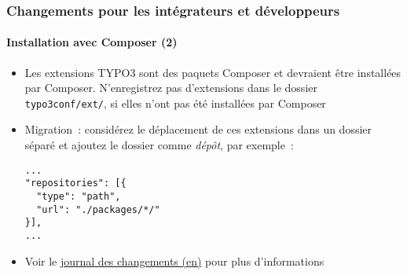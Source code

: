 %

\begin{frame}[fragile]
	\frametitle{Changements pour les intégrateurs et développeurs}
	\framesubtitle{Installation avec Composer (2)}


	\begin{itemize}
		\item Les extensions TYPO3 sont des paquets Composer et devraient être installées par Composer.
			N'enregistrez pas d'extensions dans le dossier \texttt{typo3conf/ext/},
			si elles n'ont pas été installées par Composer
		\item Migration~: considérez le déplacement de ces extensions dans un dossier séparé et ajoutez
			le dossier comme \textit{dépôt}, par exemple~:

\begin{lstlisting}
...
"repositories": [{
  "type": "path",
  "url": "./packages/*/"
}],
...
\end{lstlisting}

		\item Voir le
			\href{https://docs.typo3.org/c/typo3/cms-core/master/en-us/Changelog/master/Deprecation-94996-InComposerModeAllExtensionsShouldBeInstalledWithComposer.html}{journal des changements (en)}
			pour plus d'informations
	\end{itemize}
\end{frame}

